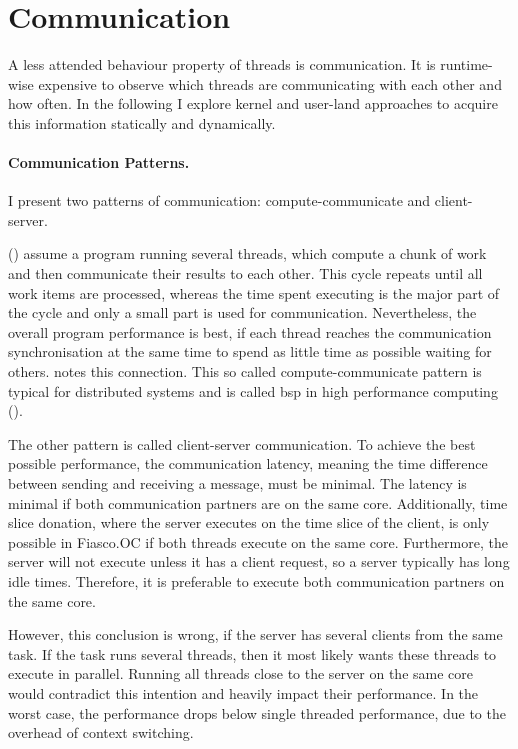 \section{Communication}
\label{design:comm}


A less attended behaviour property of threads is communication.
It is runtime-wise expensive to observe which threads are communicating with
each other and how often.
In the following I explore kernel and user-land approaches to acquire this
information statically and dynamically.


\paragraph{Communication Patterns.}
I present two patterns of communication: compute-communicate and client-server.

\citeauthor{hofmeyr_load_2010} (\cite{hofmeyr_load_2010}) assume a program running several threads, which
compute a chunk of work and then communicate their results to each other.
This cycle repeats until all work items are processed, whereas the time spent executing
is the major part of the cycle and only a small part is used for communication.
Nevertheless, the overall program performance is best, if each thread reaches
the communication synchronisation at the same time to spend as little time as
possible waiting for others.
\cite{hofmeyr_load_2010} notes this connection.
This so called compute-communicate pattern is typical for distributed systems and is
called \gls{bsp} in high performance computing (\cite{mccoll_scalability_1996}).

The other pattern is called client-server communication.
To achieve the best possible performance, the communication latency, meaning
the time difference between sending and receiving a message, must be minimal.
The latency is minimal if both communication partners are on the same core.
Additionally, time slice donation, where the server executes on the time slice
of the client, is only possible in Fiasco.OC if both threads execute on the same core.
Furthermore, the server will not execute unless it has a client request, so a
server typically has long idle times.
Therefore, it is preferable to execute both communication partners on the same
core.

However, this conclusion is wrong, if the server has several clients from the
same task.
If the task runs several threads, then it most likely wants these threads to
execute in parallel.
Running all threads close to the server on the same core would contradict this
intention and heavily impact their performance.
In the worst case, the performance drops below single threaded performance, due
to the overhead of context switching.

